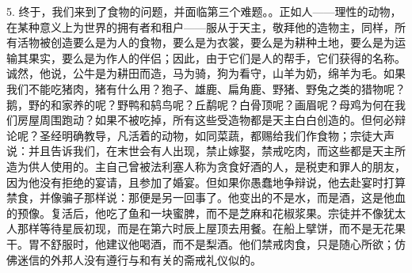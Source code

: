 5. 终于，我们来到了食物的问题，并面临第三个难题。。正如人——理性的动物，在某种意义上为世界的拥有者和租户——服从于天主，敬拜他的造物主，同样，所有活物被创造要么是为人的食物，要么是为衣裳，要么是为耕种土地，要么是为运输其果实，要么是为作人的伴侣；因此，由于它们是人的帮手，它们获得的名称。诚然，他说，公牛是为耕田而造，马为骑，狗为看守，山羊为奶，绵羊为毛。如果我们不能吃猪肉，猪有什么用？狍子、雄鹿、扁角鹿、野猪、野兔之类的猎物呢？鹅，野的和家养的呢？野鸭和鸫鸟呢？丘鹬呢？白骨顶呢？画眉呢？母鸡为何在我们房屋周围跑动？如果不被吃掉，所有这些受造物都是天主白白创造的。但何必辩论呢？圣经明确教导，凡活着的动物，如同菜蔬，都赐给我们作食物；宗徒大声说：并且告诉我们，在末世会有人出现，禁止嫁娶，禁戒吃肉，而这些都是天主所造为供人使用的。主自己曾被法利塞人称为贪食好酒的人，是税吏和罪人的朋友，因为他没有拒绝的宴请，且参加了婚宴。但如果你愚蠢地争辩说，他去赴宴时打算禁食，并像骗子那样说：那便是另一回事了。他变出的不是水，而是酒，这是他血的预像。复活后，他吃了鱼和一块蜜脾，而不是芝麻和花椒浆果。宗徒并不像犹太人那样等待星辰初现，而是在第六时辰上屋顶去用餐。在船上擘饼，而不是无花果干。胃不舒服时，他建议他喝酒，而不是梨酒。他们禁戒肉食，只是随心所欲；仿佛迷信的外邦人没有遵行与和有关的斋戒礼仪似的。\par

